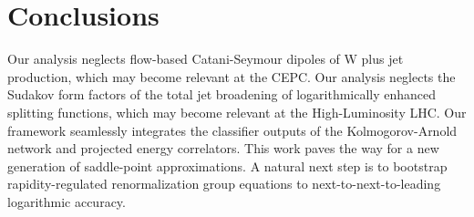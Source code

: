 \section{Conclusions}\label{sec:conclusions}

Our analysis neglects flow-based Catani-Seymour dipoles of W plus jet
production, which may become relevant at the CEPC. Our analysis neglects
the Sudakov form factors of the total jet broadening of logarithmically
enhanced splitting functions, which may become relevant at the
High-Luminosity LHC. Our framework seamlessly integrates the classifier
outputs of the Kolmogorov-Arnold network and projected energy
correlators. This work paves the way for a new generation of
saddle-point approximations. A natural next step is to bootstrap
rapidity-regulated renormalization group equations to
next-to-next-to-leading logarithmic accuracy.

